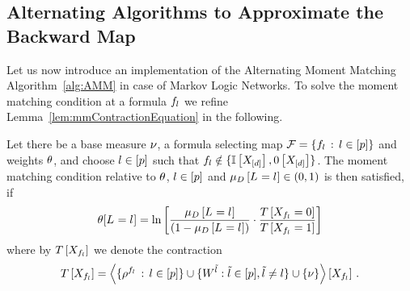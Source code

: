 \subsection{Alternating Algorithms to Approximate the Backward Map}\label{sec:alternatingParEstMLN}

Let us now introduce an implementation of the Alternating Moment Matching Algorithm~\ref{alg:AMM} in case of Markov Logic Networks.
To solve the moment matching condition at a formula $f_{l}$ we refine Lemma~\ref{lem:mmContractionEquation} in the following.

\begin{lemma}\label{ref:lemMMinMLN}
	Let there be a base measure $\nu$, a formula selecting map $\mathcal{F}=\{f_{l} \, : \, l\in[p]\}$ and weights $\theta$, and choose $l\in[p]$ such that $f_{l}  \notin \{\mathbb{I}\left[X_{[d]}\right],0\left[X_{[d]}\right]\}$.	
	The moment matching condition relative to $\theta$, $l\in[p]$ and $\mu_{D}\left[L_{}=l_{}\right]\in(0,1)$ is then satisfied, if
	\begin{align} \label{sol:momentMatchingExformula}
	 	\theta[L_{}=l_{}] = \ln \left[ 
		\frac{\mu_{D}\left[L_{}=l_{}\right]}{(1-\mu_{D}\left[L_{}=l_{}\right])} 
		\cdot \frac{T\left[X_{f_{l} }=0\right]}{T\left[X_{f_{l} }=1\right]} 
		 \right] 
	\end{align}
	where by $T\left[X_{f_{l} }\right]$ we denote the contraction 
	\begin{align*}
	 	T\left[X_{f_{l}}\right] 
		= \left\langle \{\rho^{f_{l}} \, : \, l\in[p]\}
		\cup\{W^{\tilde{l}} : \tilde{l} \in [p], \tilde{l}\neq l\}
		\cup\{\nu\}\right\rangle \left[ X_{f_{l}} \right] \, . 
	\end{align*}
\end{lemma}
